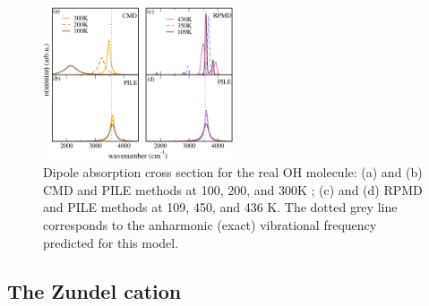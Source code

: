 \documentclass[aps,prb,superscriptaddress,amsmath,amssymb,showpacs,twocolumn]{revtex4}
\begin{document}
\begin{figure}[htbp]
\centering
\includegraphics[width=0.5\textwidth]{figures/comparison_ohanharm_factors.pdf}
\caption{Dipole absorption cross section for the real OH molecule: (a) and (b) CMD and PILE methods at 100, 200, and 300K ; (c)  and (d) RPMD and PILE methods at 109, 450, and 436 K. The dotted grey line corresponds to the anharmonic (exact) vibrational frequency predicted for this model.}
\label{fig:oh-rpmd-cmd-pile}
\end{figure}


\subsection{The Zundel cation}
\end{document}
